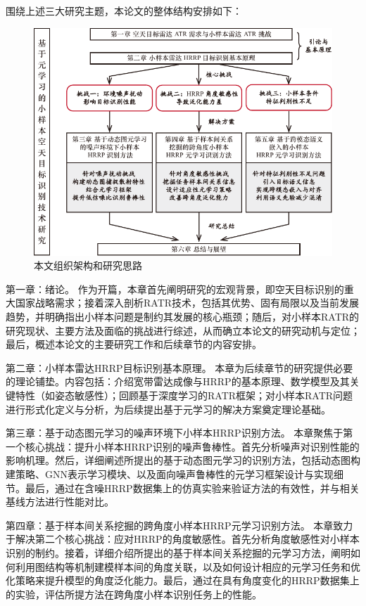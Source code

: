 {围绕上述三大研究主题，本论文的整体结构安排如下：

\begin{figure}[h]
    \centering
    \includegraphics[width=0.95\linewidth]{figures/framework.pdf}
    \caption{本文组织架构和研究思路}
    \label{fig:framework}
\end{figure}

{第一章：绪论。} 作为开篇，本章首先阐明研究的宏观背景，即空天目标识别的重大国家战略需求；接着深入剖析RATR技术，包括其优势、固有局限以及当前发展趋势，并明确指出小样本问题是制约其发展的核心瓶颈；随后，对小样本RATR的研究现状、主要方法及面临的挑战进行综述，从而确立本论文的研究动机与定位；最后，概述本论文的主要研究工作和后续章节的内容安排。

{第二章：小样本雷达HRRP目标识别基本原理。} 本章为后续章节的研究提供必要的理论铺垫。内容包括：介绍宽带雷达成像与HRRP的基本原理、数学模型及其关键特性（如姿态敏感性）；回顾基于深度学习的RATR框架；对小样本RATR问题进行形式化定义与分析，为后续提出基于元学习的解决方案奠定理论基础。

{第三章：基于动态图元学习的噪声环境下小样本HRRP识别方法。} 本章聚焦于第一个核心挑战：提升小样本HRRP识别的噪声鲁棒性。首先分析噪声对识别性能的影响机理。然后，详细阐述所提出的基于动态图元学习的识别方法，包括动态图构建策略、GNN表示学习模块、以及面向噪声鲁棒性的元学习框架设计与实现细节。最后，通过在含噪HRRP数据集上的仿真实验来验证方法的有效性，并与相关基线方法进行性能对比。

{第四章：基于样本间关系挖掘的跨角度小样本HRRP元学习识别方法。} 本章致力于解决第二个核心挑战：应对HRRP的角度敏感性。首先分析角度敏感性对小样本识别的制约。接着，详细介绍所提出的基于样本间关系挖掘的元学习方法，阐明如何利用图结构等机制建模样本间的角度关联，以及如何设计相应的元学习任务和优化策略来提升模型的角度泛化能力。最后，通过在具有角度变化的HRRP数据集上的实验，评估所提方法在跨角度小样本识别任务上的性能。

}
